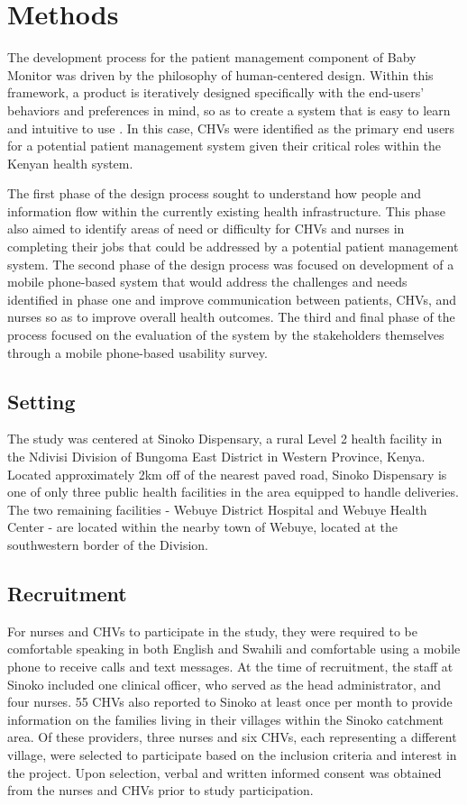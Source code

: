 \section{Methods}


The development process for the patient management component of Baby Monitor was driven by the philosophy of human-centered design. Within this framework, a product is iteratively designed specifically with the end-users' behaviors and preferences in mind, so as to create a system that is easy to learn and intuitive to use \citep{Oviatt2006}. In this case, CHVs  were identified as the primary end users for a potential patient management system given their critical roles within the Kenyan health system. 

The first phase of the design process sought to understand how people and information flow within the currently existing health infrastructure. This phase also aimed to identify areas of need or difficulty for CHVs and nurses in completing their jobs that could be addressed by a potential patient management system. The second phase of the design process was focused on development of a mobile phone-based system that would address the challenges and needs identified in phase one and improve communication between patients, CHVs, and nurses so as to improve overall health outcomes. The third and final phase of the process focused on the evaluation of the system by the stakeholders themselves through a mobile phone-based usability survey.

\subsection{Setting}

The study was centered at Sinoko Dispensary, a rural Level 2 health facility in the Ndivisi Division of Bungoma East District in Western Province, Kenya. Located approximately 2km off of the nearest paved road, Sinoko Dispensary is one of only three public health facilities in the area equipped to handle deliveries. The two remaining facilities - Webuye District Hospital and Webuye Health Center - are located within the nearby town of Webuye, located at the southwestern border of the Division. 

\subsection{Recruitment}
For nurses and CHVs to participate in the study, they were required to be comfortable speaking in both English and Swahili and comfortable using a mobile phone to receive calls and text messages. 
At the time of recruitment, the staff at Sinoko included one clinical officer, who served as the head administrator, and four nurses. 55 CHVs also reported to Sinoko at least once per month to provide information on the families living in their villages within the Sinoko catchment area. Of these providers, three nurses and six CHVs, each representing a different village, were selected to participate based on the inclusion criteria and interest in the project. Upon selection, verbal and written informed consent was obtained from the nurses and CHVs prior to study participation. 

